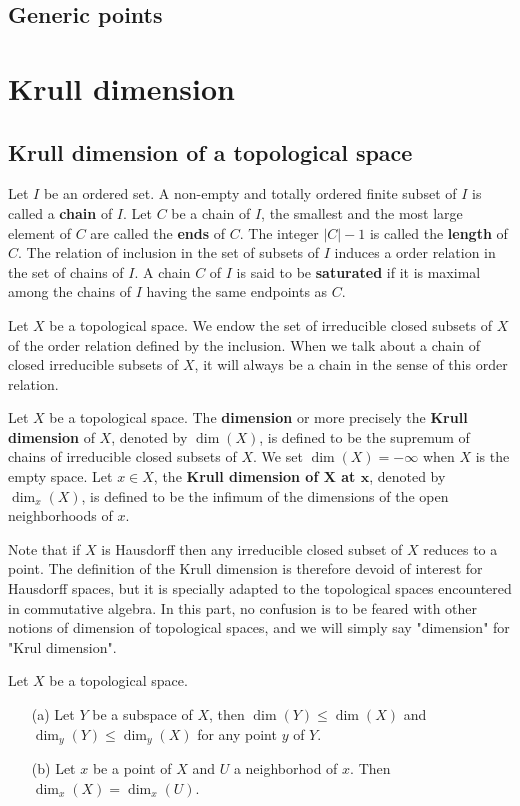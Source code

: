 \subsection{Generic points}
\section{Krull dimension}
\subsection{Krull dimension of a topological space}
\begin{definition}
Let $I$ be an ordered set. A non-empty and totally ordered finite subset of $I$ is called a \textbf{chain} of $I$. Let $C$ be a chain of $I$, the smallest and the most large element of $C$ are called the \textbf{ends} of $C$. The integer $|C|-1$ is called the \textbf{length} of $C$. The relation of inclusion in the set of subsets of $I$ induces a order relation in the set of chains of $I$. A chain $C$ of $I$ is said to be \textbf{saturated} if it is maximal among the chains of $I$ having the same endpoints as $C$.
\end{definition}
Let $X$ be a topological space. We endow the set of irreducible closed subsets of $X$ of the order relation defined by the inclusion. When we talk about a chain of closed irreducible subsets of $X$, it will always be a chain in the sense of this order relation.
\begin{definition}
Let $X$ be a topological space. The \textbf{dimension} or more precisely the \textbf{Krull dimension} of $X$, denoted by $\dim(X)$, is defined to be the supremum of chains of irreducible closed subsets of $X$. We set $\dim(X)=-\infty$ when $X$ is the empty space. Let $x\in X$, the \textbf{Krull dimension of $\bm{X}$ at $\bm{x}$}, denoted by $\dim_x(X)$, is defined to be the infimum of the dimensions of the open neighborhoods of $x$.
\end{definition}
Note that if $X$ is Hausdorff then any irreducible closed subset of $X$ reduces to a point. The definition of the Krull dimension is therefore devoid of interest for Hausdorff spaces, but it is specially adapted to the topological spaces encountered in commutative algebra. In this part, no confusion is to be feared with other notions of dimension of topological spaces, and we will simply say "dimension" for "Krul dimension".
\begin{proposition}\label{topo space Krull dimension prop}
Let $X$ be a topological space.
\begin{itemize}
\item[(a)] Let $Y$ be a subspace of $X$, then $\dim(Y)\leq\dim(X)$ and $\dim_y(Y)\leq\dim_y(X)$ for any point $y$ of $Y$.
\item[(b)] Let $x$ be a point of $X$ and $U$ a neighborhod of $x$. Then $\dim_x(X)=\dim_x(U)$.
\end{itemize}
\end{proposition}
